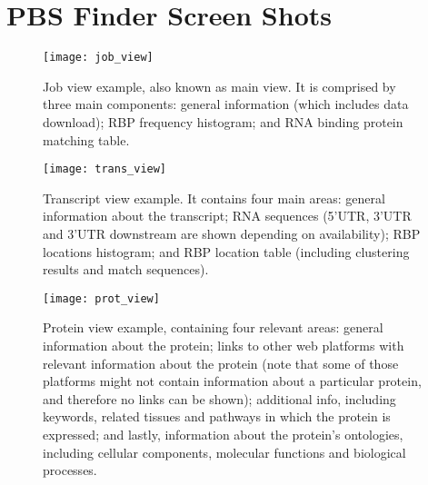 \chapter{PBS Finder Screen Shots}\label{appendix:screenshots}

\begin{figure}[!htb]
  \begin{center}
    \leavevmode
    \texttt{[image: job\_view]}
    \caption[Job view example]{
      Job view example, also known as main view. It is comprised by three main
      components: general information (which includes data download); RBP
      frequency histogram; and RNA binding protein matching table.
    }
    \label{fig:job_view}
  \end{center}
\end{figure}

\begin{figure}[!htb]
  \begin{center}
    \leavevmode
    \texttt{[image: trans\_view]}
    \caption[Transcript view example]{
      Transcript view example. It contains four main areas: general information
      about the transcript; RNA sequences (5’UTR, 3’UTR and 3’UTR downstream are
      shown depending on availability); RBP locations histogram; and RBP
      location table (including clustering results and match sequences).
    }
    \label{fig:trans_view}
  \end{center}
\end{figure}

\begin{figure}[!htb]
  \begin{center}
    \leavevmode
    \texttt{[image: prot\_view]}
    \caption[Protein view example]{
      Protein view example, containing four relevant areas: general information
      about the protein; links to other web platforms with relevant information
      about the protein (note that some of those platforms might not contain
      information about a particular protein, and therefore no links can be
      shown); additional info, including keywords, related tissues and pathways
      in which the protein is expressed; and lastly, information about the
      protein's ontologies, including cellular components, molecular functions
      and biological processes.
    }
    \label{fig:prot_view}
  \end{center}
\end{figure}


